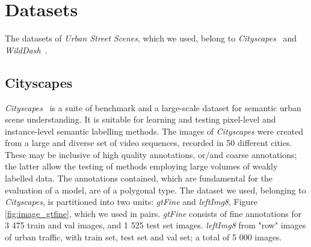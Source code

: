 \documentclass[10pt,twocolumn,letterpaper]{article}
\begin{document}
\section{Datasets}
The datasets of \textit{Urban Street Scenes}, which we used, belong to \textit{Cityscapes}~\cite{cityscapes} and \textit{WildDash}~\cite{wildDash}.
\subsection{Cityscapes}
\textit{Cityscapes}~\cite{cityscapes} is a suite of benchmark and a large-scale dataset for semantic urban scene understanding. It is suitable for learning and testing pixel-level and instance-level semantic labelling methods.  The images of \textit{Cityscapes} were created from a large and diverse set of video sequences, recorded in 50 different cities. These may be inclusive of high quality annotations, or/and coarse annotations; the latter allow the testing of methods employing large volumes of weakly labelled data. The annotations contained, which are fundamental for the evaluation of a model, are of a polygonal type.
The dataset we used, belonging to \textit{Cityscapes}, is partitioned into two units: \textit{gtFine} and \textit{leftImg8}, Figure \ref{fig:image_gtfine}, which we used in pairs. \textit{gtFine} consists of fine annotations for 3 475 train and val images, and 1 525 test set images.
\textit{leftImg8} from "row" images of urban traffic, with train set, test set and val set; a total of 5 000 images.
\end{document}
